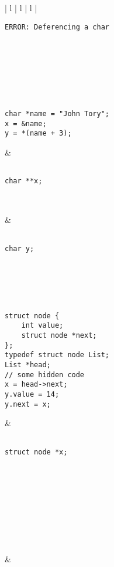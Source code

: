 \documentclass[11pt]{article}
\begin{document}
\begin{enumerate}
\begin{tabular}[c]{| l | l | l |}
\begin{minipage}{0.3\textwidth}
\begin{Verbatim}
ERROR: Deferencing a char





				\end{Verbatim}
			\end{minipage}\\
			\hline
			\begin{minipage}{0.3\textwidth}
				\begin{Verbatim}

char *name = "John Tory";
x = &name;
y = *(name + 3);

				\end{Verbatim}
			\end{minipage} &
			\begin{minipage}{0.3\textwidth}
				\begin{Verbatim}

char **x;



				\end{Verbatim}
			\end{minipage} &
			\begin{minipage}{0.3\textwidth}
				\begin{Verbatim}

char y;



				\end{Verbatim}
			\end{minipage}\\
			\hline
			\begin{minipage}{0.3\textwidth}
				\begin{Verbatim}

struct node {
	int value;
	struct node *next;
};
typedef struct node List;
List *head;
// some hidden code
x = head->next;
y.value = 14;
y.next = x;

				\end{Verbatim}
			\end{minipage} &
			\begin{minipage}{0.3\textwidth}
				\begin{Verbatim}

struct node *x;










				\end{Verbatim}
			\end{minipage} &
			\begin{minipage}{0.3\textwidth}
				\begin{Verbatim}


\end{Verbatim}
\end{minipage}
\end{tabular}
\end{enumerate}
\end{document}
